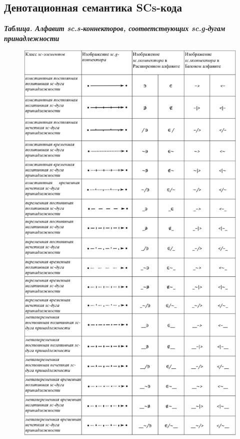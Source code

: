 \newpage
\subsection{Денотационная семантика SCs-кода}
\label{sec_scs_semantics}

\textbf{\textit{Таблица. Алфавит sc.s-коннекторов, соответствующих sc.g-дугам принадлежности\scnsupergroupsign}}
\begin{figure}[h]
	\centering
	\includegraphics[scale=0.8]{images/intro/scs_membership_connectors.pdf}
\end{figure}

